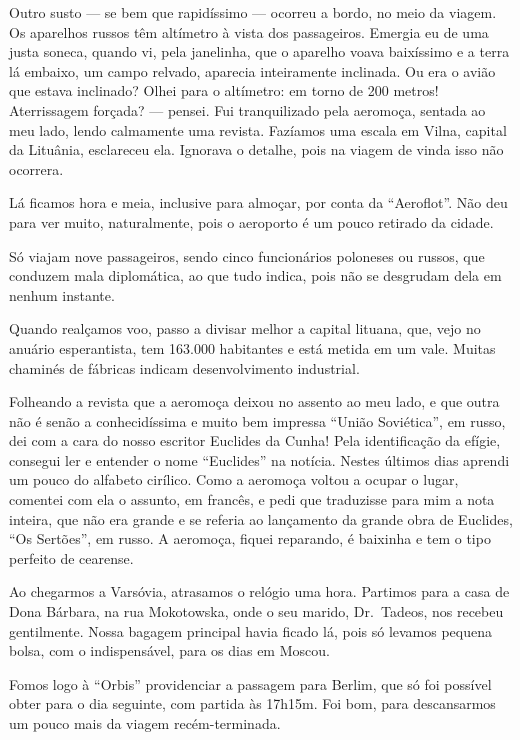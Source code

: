 Outro susto --- se bem que rapidíssimo --- ocorreu a bordo, no meio da viagem. Os aparelhos russos têm altímetro à vista dos passageiros. Emergia eu de uma justa soneca, quando vi, pela janelinha, que o aparelho voava baixíssimo e a terra lá embaixo, um campo relvado, aparecia inteiramente inclinada. Ou era o avião que estava inclinado? Olhei para o altímetro: em torno de 200 metros! Aterrissagem forçada? --- pensei. Fui tranquilizado pela aeromoça, sentada ao meu lado, lendo calmamente uma revista. Fazíamos uma escala em Vilna, capital da Lituânia, esclareceu ela. Ignorava o detalhe, pois na viagem de vinda isso não ocorrera.

Lá ficamos hora e meia, inclusive para almoçar, por conta da ``Aeroflot''. Não deu para ver muito, naturalmente, pois o aeroporto é um pouco retirado da cidade.

Só viajam nove passageiros, sendo cinco funcionários poloneses ou russos, que conduzem mala diplomática, ao que tudo indica, pois não se desgrudam dela em nenhum instante.

Quando realçamos voo, passo a divisar melhor a capital lituana, que, vejo no anuário esperantista, tem 163.000 habitantes e está metida em um vale. Muitas chaminés de fábricas indicam desenvolvimento industrial.

Folheando a revista que a aeromoça deixou no assento ao meu lado, e que outra não é senão a conhecidíssima e muito bem impressa ``União Soviética'', em russo, dei com a cara do nosso escritor Euclides da Cunha! Pela identificação da efígie, consegui ler e entender o nome ``Euclides'' na notícia. Nestes últimos dias aprendi um pouco do alfabeto cirílico. Como a aeromoça voltou a ocupar o lugar, comentei com ela o assunto, em francês, e pedi que traduzisse para mim a nota inteira, que não era grande e se referia ao lançamento da grande obra de Euclides, ``Os Sertões'', em russo. A aeromoça, fiquei reparando, é baixinha e tem o tipo perfeito de cearense.

Ao chegarmos a Varsóvia, atrasamos o relógio uma hora. Partimos para a casa de Dona Bárbara, na rua Mokotowska, onde o seu marido, Dr.~Tadeos, nos recebeu gentilmente. Nossa bagagem principal havia ficado lá, pois só levamos pequena bolsa, com o indispensável, para os dias em Moscou.

Fomos logo à ``Orbis'' providenciar a passagem para Berlim, que só foi possível obter para o dia seguinte, com partida às 17h15m. Foi bom, para descansarmos um pouco mais da viagem recém-terminada.

